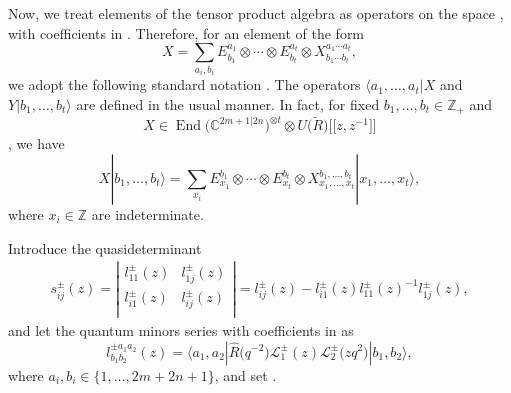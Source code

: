 \documentclass[10pt,a4paper]{amsart}
\numberwithin{equation}{section}
\begin{document}
 Now, we treat elements of the tensor product algebra
 as operators on the space , with coefficients in .
Therefore, for an element of the form
\begin{equation*}
 X = \sum\limits_{a_i,b_i} E^{a_1}_{b_1} \otimes \cdots \otimes E^{a_t}_{b_t} \otimes X^{a_1 \cdots a_t}_{b_1 \cdots b_t},
\end{equation*}
we adopt the following standard notation
.
The operators $\langle a_1, \ldots, a_t | X$ and $Y | b_1, \ldots, b_t \rangle$ are defined in the usual manner.
In fact, for fixed $b_1, \ldots, b_t \in \mathbb{Z}_+$ and \[X \in \operatorname{End}\bigl(\mathbb{C}^{2m+1|2n}\bigr)^{\otimes t} \otimes U\bigl(\widetilde{R}\bigr)\bigl[\bigl[z,z^{-1}\bigr]\bigr]\], we have
\begin{equation*}
 X | b_1, \ldots, b_t \rangle = \sum\limits_{x_i} E_{x_1}^{b_1} \otimes \cdots \otimes E_{x_t}^{b_t} \otimes X_{x_1, \ldots, x_t}^{b_1, \ldots, b_t} | x_1, \ldots, x_t \rangle,
\end{equation*}
where $x_i \in \mathbb{Z}$ are indeterminate.



Introduce the quasideterminant
\begin{align*}s^{\pm}_{ij}(z)=
 \left|
 \begin{matrix}
 l_{11}^{\pm}(z) & l_{1j}^{\pm}(z) \\
 l_{i1}^{\pm}(z) & \boxed{l_{ij}^{\pm}(z)} \\
 \end{matrix}
 \right|= l_{ij}^{\pm}(z)- l_{i1}^{\pm}(z) l_{11}^{\pm}(z)^{-1} l_{1j}^{\pm}(z),
\end{align*}and let the quantum minors series  with coefficients in  as
\[%
 l^{\pm a_1a_2}_{b_1b_2}(z)=\big\langle a_1, a_2|\widehat{R}\bigl(q^{-2}\bigr)\mathcal{L}_1^{\pm}(z)\mathcal{L}_2^{\pm}\bigl(zq^{2}\bigr)|b_1, b_2\big\rangle,
\]
where $a_i, b_i\in\{1,\dots,2m+2n+1\}$, and set
.
\end{document}
